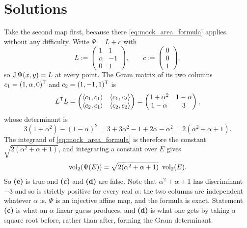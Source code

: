 
\section{Solutions}
\label{sec:gram_determinant_solutions}

\begin{exercisesolution}
\label{sol:area_formula_two_maps}
Take the second map first, because there \eqref{eq:mock_area_formula} applies without any
difficulty. Write $\Psi = L + c$ with
\[L := \begin{pmatrix} 1 & 1 \\ \alpha & -1 \\ 0 & 1 \end{pmatrix}, \qquad
  c := \begin{pmatrix} 0 \\ 0 \\ 1 \end{pmatrix},\]
so $\operatorname{J}\Psi(x,y) = L$ at every point. The Gram matrix of its two columns
$c_1 = (1,\alpha,0)^{\mathsf{T}}$ and $c_2 = (1,-1,1)^{\mathsf{T}}$ is
\[L^{\mathsf{T}} L = \begin{pmatrix} \langle c_1,c_1\rangle & \langle c_1,c_2\rangle \\
  \langle c_2,c_1\rangle & \langle c_2,c_2\rangle \end{pmatrix}
  = \begin{pmatrix} 1+\alpha^2 & 1-\alpha \\ 1-\alpha & 3 \end{pmatrix},\]
whose determinant is
\[3(1+\alpha^2) - (1-\alpha)^2 = 3 + 3\alpha^2 - 1 + 2\alpha - \alpha^2 = 2(\alpha^2+\alpha+1).\]
The integrand of \eqref{eq:mock_area_formula} is therefore the constant
$\sqrt{2(\alpha^2+\alpha+1)}$, and integrating a constant over $E$ gives
\[\operatorname{vol}_2(\Psi(E)) = \sqrt{2(\alpha^2+\alpha+1)}\ \operatorname{vol}_2(E).\]
So \textbf{(e)} is true and \textbf{(c)} and \textbf{(d)} are false. Note that
$\alpha^2+\alpha+1$ has discriminant $-3$ and so is strictly positive for every real $\alpha$:
the two columns are independent whatever $\alpha$ is, $\Psi$ is an injective affine map, and the
formula is exact. Statement \textbf{(c)} is what an $\alpha$-linear guess produces, and
\textbf{(d)} is what one gets by taking a square root before, rather than after, forming the
Gram determinant.


\end{exercisesolution}
